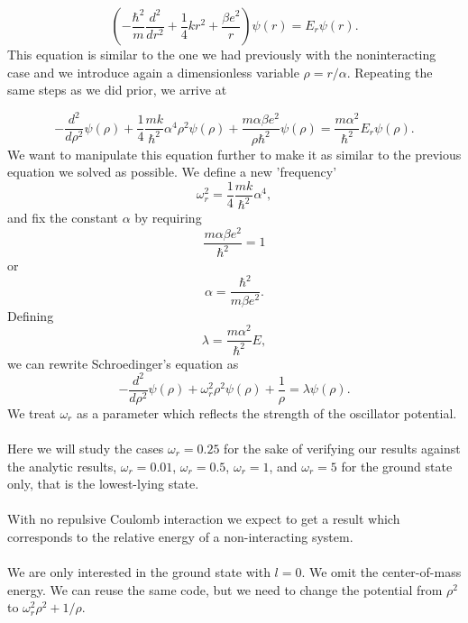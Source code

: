 \documentclass{article}
\begin{document}
\begin{equation*}
\left(  -\frac{\hbar^2}{m} \frac{d^2}{dr^2}+ \frac{1}{4}k r^2+\frac{\beta e^2}{r}\right)\psi(r)  = E_r \psi(r).
\end{equation*}
This equation is similar to the one we had previously with the noninteracting case and we introduce again a dimensionless variable $\rho = r/\alpha$. Repeating the same steps as we did prior, we arrive at

\begin{equation*}
  -\frac{d^2}{d\rho^2} \psi(\rho) 
       + \frac{1}{4}\frac{mk}{\hbar^2} \alpha^4\rho^2\psi(\rho)+\frac{m\alpha \beta e^2}{\rho\hbar^2}\psi(\rho)  = 
\frac{m\alpha^2}{\hbar^2}E_r \psi(\rho) .
\end{equation*}
We want to manipulate this equation further to make it as similar to the previous equation we solved as possible. We define a new 'frequency'
\begin{equation*}
\omega_r^2=\frac{1}{4}\frac{mk}{\hbar^2} \alpha^4,
\end{equation*}
and fix the constant $\alpha$ by requiring
\begin{equation*}
\frac{m\alpha \beta e^2}{\hbar^2}=1
\end{equation*}
or
\begin{equation*}
\alpha = \frac{\hbar^2}{m\beta e^2}.
\end{equation*}
Defining
\begin{equation*}
\lambda = \frac{m\alpha^2}{\hbar^2}E,
\end{equation*}
we can rewrite Schroedinger's equation as
\begin{equation*}
  -\frac{d^2}{d\rho^2} \psi(\rho) + \omega_r^2\rho^2\psi(\rho) +\frac{1}{\rho} = \lambda \psi(\rho).
\end{equation*}
We treat $\omega_r$ as a parameter which reflects the strength of the oscillator potential.\\
\\
Here we will study the cases $\omega_r=0.25$ for the sake of verifying our results against the analytic results, $\omega_r = 0.01$, $\omega_r = 0.5$, $\omega_r =1$,
and $\omega_r = 5$   
for the ground state only, that is the lowest-lying state.\\
\\
With no repulsive Coulomb interaction we expect to get a result which corresponds to the relative energy of a non-interacting system. \\  
\\
We are only interested in the ground state with $l=0$. We omit the center-of-mass energy. We can reuse the same code, but we need to change the potential from $\rho^2$ to $\omega_r^2\rho^2+1/\rho$. \\
\end{document}
